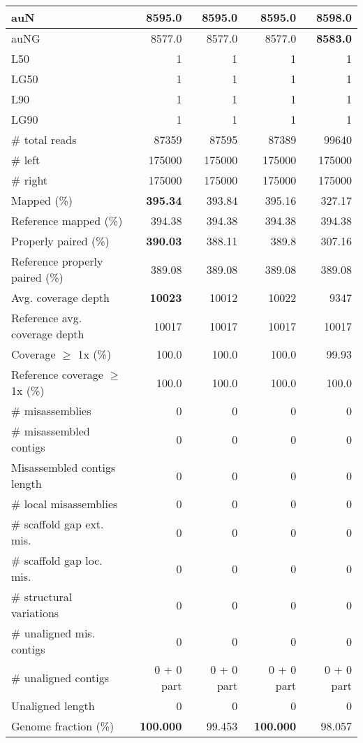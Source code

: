 \documentclass[12pt,a4paper]{article}
\begin{document}
\begin{table}[ht]
\begin{center}
\begin{tabular}{|l*{4}{|r}|}
auN & 8595.0 & 8595.0 & 8595.0 & {\bf 8598.0} \\ \hline
auNG & 8577.0 & 8577.0 & 8577.0 & {\bf 8583.0} \\ \hline
L50 & 1 & 1 & 1 & 1 \\ \hline
LG50 & 1 & 1 & 1 & 1 \\ \hline
L90 & 1 & 1 & 1 & 1 \\ \hline
LG90 & 1 & 1 & 1 & 1 \\ \hline
\# total reads & 87359 & 87595 & 87389 & 99640 \\ \hline
\# left & 175000 & 175000 & 175000 & 175000 \\ \hline
\# right & 175000 & 175000 & 175000 & 175000 \\ \hline
Mapped (\%) & {\bf 395.34} & 393.84 & 395.16 & 327.17 \\ \hline
Reference mapped (\%) & 394.38 & 394.38 & 394.38 & 394.38 \\ \hline
Properly paired (\%) & {\bf 390.03} & 388.11 & 389.8 & 307.16 \\ \hline
Reference properly paired (\%) & 389.08 & 389.08 & 389.08 & 389.08 \\ \hline
Avg. coverage depth & {\bf 10023} & 10012 & 10022 & 9347 \\ \hline
Reference avg. coverage depth & 10017 & 10017 & 10017 & 10017 \\ \hline
Coverage $\geq$ 1x (\%) & 100.0 & 100.0 & 100.0 & 99.93 \\ \hline
Reference coverage $\geq$ 1x (\%) & 100.0 & 100.0 & 100.0 & 100.0 \\ \hline
\# misassemblies & 0 & 0 & 0 & 0 \\ \hline
\# misassembled contigs & 0 & 0 & 0 & 0 \\ \hline
Misassembled contigs length & 0 & 0 & 0 & 0 \\ \hline
\# local misassemblies & 0 & 0 & 0 & 0 \\ \hline
\# scaffold gap ext. mis. & 0 & 0 & 0 & 0 \\ \hline
\# scaffold gap loc. mis. & 0 & 0 & 0 & 0 \\ \hline
\# structural variations & 0 & 0 & 0 & 0 \\ \hline
\# unaligned mis. contigs & 0 & 0 & 0 & 0 \\ \hline
\# unaligned contigs & 0 + 0 part & 0 + 0 part & 0 + 0 part & 0 + 0 part \\ \hline
Unaligned length & 0 & 0 & 0 & 0 \\ \hline
Genome fraction (\%) & {\bf 100.000} & 99.453 & {\bf 100.000} & 98.057 \\ \hline

\end{tabular}
\end{center}
\end{table}
\end{document}

